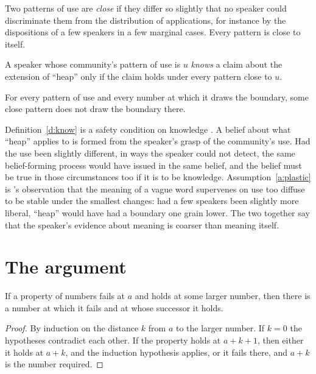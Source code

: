 \documentclass{situationist-preprint}
\begin{document}
\begin{definition}\label{d:close}
Two patterns of use are \emph{close} if they differ so slightly that no speaker could discriminate them from the distribution of applications, for instance by the dispositions of a few speakers in a few marginal cases. Every pattern is close to itself.
\end{definition}

\begin{definition}\label{d:know}
A speaker whose community's pattern of use is $u$ \emph{knows} a claim about the extension of \enquote{heap} only if the claim holds under every pattern close to $u$.
\end{definition}

\begin{assumption}\label{a:plastic}
For every pattern of use and every number at which it draws the boundary, some close pattern does not draw the boundary there.
\end{assumption}

Definition~\ref{d:know} is a safety condition on knowledge \citep[ch.~5]{Williamson2000}. A belief about what \enquote{heap} applies to is formed from the speaker's grasp of the community's use. Had the use been slightly different, in ways the speaker could not detect, the same belief-forming process would have issued in the same belief, and the belief must be true in those circumstances too if it is to be knowledge. Assumption~\ref{a:plastic} is \citet[ch.~7]{Williamson1994}'s observation that the meaning of a vague word supervenes on use too diffuse to be stable under the smallest changes: had a few speakers been slightly more liberal, \enquote{heap} would have had a boundary one grain lower. The two together say that the speaker's evidence about meaning is coarser than meaning itself.

\section{The argument}\label{s:arg}

\begin{lemma}\label{l:last}
If a property of numbers fails at $a$ and holds at some larger number, then there is a number at which it fails and at whose successor it holds.
\end{lemma}

\begin{proof}
By induction on the distance $k$ from $a$ to the larger number. If $k = 0$ the hypotheses contradict each other. If the property holds at $a + k + 1$, then either it holds at $a + k$, and the induction hypothesis applies, or it fails there, and $a + k$ is the number required.
\end{proof}
\end{document}
